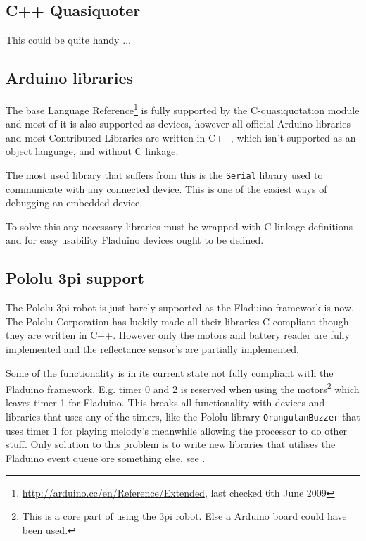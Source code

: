 \documentclass[a4paper, oneside, final]{memoir}
\let\fref\undefined
\begin{document}
\subsection{C++ Quasiquoter}

This could be quite handy $\ldots$

\subsection{Arduino libraries}

The base Language
Reference\footnote{\url{http://arduino.cc/en/Reference/Extended}, last checked
  6th June 2009} is fully supported by the C-quasiquotation module and most of
it is also supported as devices, however all official Arduino libraries and most
Contributed Libraries are written in C++, which isn't supported as an object
language, and without C linkage. 

The most used library that suffers from this is the \texttt{Serial} library used
to communicate with any connected device. This is one of the easiest ways of
debugging an embedded device.

To solve this any necessary libraries must be wrapped with C linkage definitions
and for easy usability Fladuino devices ought to be defined.

\subsection{Pololu 3pi support}

The Pololu 3pi robot is just barely supported as the Fladuino framework is
now. The Pololu Corporation has luckily made all their libraries C-compliant
though they are written in C++. However only the motors and battery reader are
fully implemented and the reflectance sensor's are partially implemented.

Some of the functionality is in its current state not fully compliant with the
Fladuino framework. E.g. timer 0 and 2 is reserved when using the
motors\footnote{This is a core part of using the 3pi robot. Else a Arduino board
  could have been used.} which leaves timer 1 for Fladuino. This breaks all
functionality with devices and libraries that uses any of the timers, like the
Pololu library \texttt{OrangutanBuzzer} that uses timer 1 for playing melody's
meanwhile allowing the processor to do other stuff. Only solution to this
problem is to write new libraries that utilises the Fladuino event queue ore
something else, see \fref{sec:fladuino-event-queue}.
\end{document}
